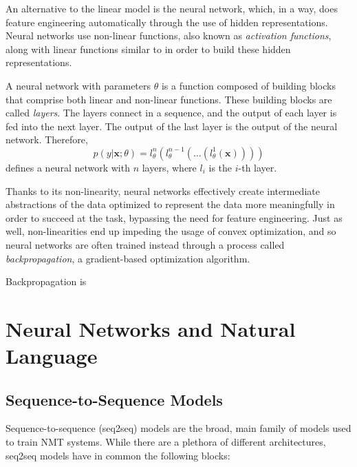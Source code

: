 An alternative to the linear model is the neural network, which, in a
way, does feature engineering automatically through the use of hidden
representations. Neural networks use non-linear functions, also known
as \textit{activation functions}, along with linear functions similar
to  in order to build these hidden representations.

\begin{definition}
    A neural network with parameters $\theta$ is a function
    composed of building blocks that comprise both linear and non-linear
    functions. These building blocks are called \textit{layers}.
    The layers connect in a sequence, and the output of each
    layer is fed into the next layer. The output of the last layer is
    the output of the neural network. Therefore,
    \begin{equation}
        p\left(y|\bm{x};\theta\right)=l_\theta^{n}\left(l_\theta^{n-1}\left(\dots\left(l_\theta^{1}\left(\bm{x}\right)\right)\right)\right)
    \end{equation}
    defines a neural network with $n$ layers, where $l_i$ is the
    $i$-th layer.
\end{definition}

Thanks to its non-linearity, neural networks effectively create
intermediate abstractions of the data optimized to
represent the data more meaningfully in order to succeed at the task, bypassing the need
for feature engineering. Just as well, non-linearities end up
impeding the usage of convex optimization, and so neural networks
are often trained instead through a process called \textit{backpropagation},
a gradient-based optimization algorithm.

\begin{definition}[Backpropagation]
    Backpropagation is
\end{definition}


\section{Neural Networks and Natural Language}

\subsection{Sequence-to-Sequence Models}
\label{sec:transformer_bg}

Sequence-to-sequence (seq2seq) models are the broad, main family of models
used to train NMT systems. While there are a plethora of different architectures,
seq2seq models have in common the following blocks:


